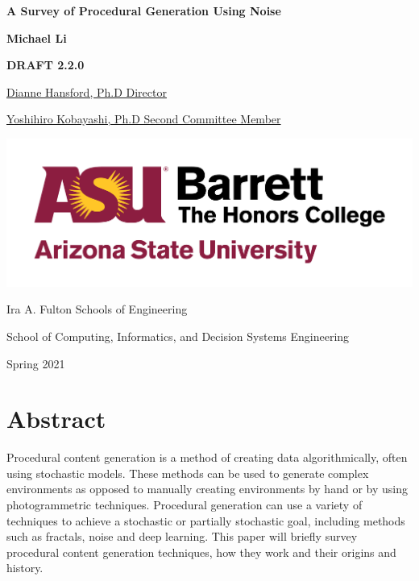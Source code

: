 \documentclass[10pt]{report}
\begin{document}
	\begin{titlepage}
		\begin{center}
			\Large
			\textbf{A Survey of Procedural Generation Using Noise}
			
			\vspace{1.5cm}
			\normalsize
			\textbf{Michael Li}
			
			\vfill
			
			\textbf{DRAFT 2.2.0}
			
			\uline{Dianne Hansford, Ph.D \hfill Director}
			\vspace{1cm}
			
			\uline{Yoshihiro Kobayashi, Ph.D \hfill Second Committee Member}
			
			\vspace{3cm}
			
			\includegraphics[scale=.5]{asu_barretthonors_horiz_rgb_maroongold_600ppi}
			
			\vspace{1.5cm}
			Ira A. Fulton Schools of Engineering
			
			School of Computing, Informatics, and Decision Systems Engineering
			
			Spring 2021
			
		\end{center}
	\end{titlepage}
	
	\chapter*{Abstract}
	
	Procedural content generation is a method of creating data algorithmically, often using stochastic models. These methods can be used to generate complex environments as opposed to manually creating environments by hand or by using photogrammetric techniques. Procedural generation can use a variety of techniques to achieve a stochastic or partially stochastic goal, including methods such as fractals, noise and deep learning. This paper will briefly survey procedural content generation techniques, how they work and their origins and history.
	
\end{document}
